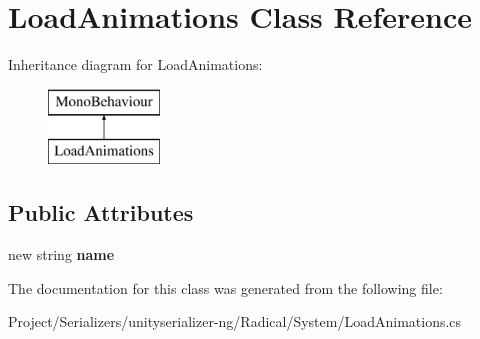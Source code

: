 \hypertarget{class_load_animations}{}\section{Load\+Animations Class Reference}
\label{class_load_animations}
Inheritance diagram for Load\+Animations\+:\begin{figure}[H]
\begin{center}
\leavevmode
\includegraphics[height=2.000000cm]{class_load_animations}
\end{center}
\end{figure}
\subsection*{Public Attributes}
\begin{DoxyCompactItemize}
\item 
\mbox{\label{class_load_animations_aaac48acb2bd106455dd1c95ea73da4bd}} 
new string {\bfseries name}
\end{DoxyCompactItemize}


The documentation for this class was generated from the following file\+:\begin{DoxyCompactItemize}
\item 
Project/\+Serializers/unityserializer-\/ng/\+Radical/\+System/Load\+Animations.\+cs\end{DoxyCompactItemize}
